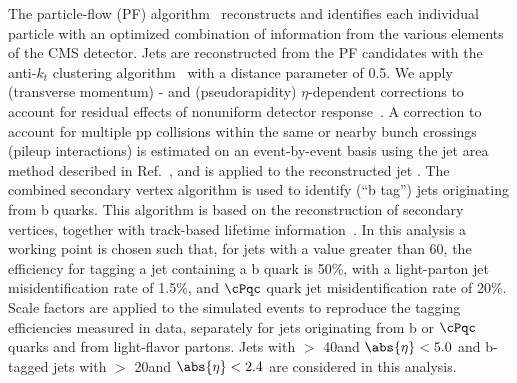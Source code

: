 The particle-flow (PF) algorithm~\cite{CMS-PAS-PFT-09-001,CMS-PAS-PFT-10-001} reconstructs and identifies each individual particle with an optimized combination of information from the various elements of the CMS detector. 
Jets are reconstructed from the PF candidates with the anti-$k_t$ clustering
algorithm~\cite{Cacciari:2008gp} with a distance parameter of 0.5. We apply
 (transverse momentum) \pt- and (pseudorapidity) $\eta$-dependent corrections to account for residual
effects of nonuniform detector response~\cite{Chatrchyan:2011ds}.
A correction to account for multiple pp collisions within the same or nearby
bunch crossings (pileup interactions) is estimated on an event-by-event basis using the
jet area method described in Ref.~\cite{Cacciari:2007fd}, and is
applied to the reconstructed jet \pt.
The combined secondary vertex algorithm is used to identify (``b tag'') jets 
originating from b quarks.  This algorithm 
 is based on the reconstruction of secondary vertices, together with track-based lifetime information~\cite{Chatrchyan:2012jua}. 
In this analysis a working point is chosen such that, for jets with a \PT value greater than 60\GeV, the efficiency for tagging a jet containing a b quark is 50\%, with a light-parton jet misidentification rate of 1.5\%, and $\cPqc$ quark jet misidentification rate of 20\%.
Scale factors are applied to the simulated events to reproduce the tagging efficiencies measured in data, 
separately for jets originating from b or $\cPqc$ quarks and from light-flavor partons.
Jets with  \PT $>$ 40\GeV and $\abs{\eta} < 5.0$ and b-tagged jets with \PT $>$ 20\GeV and $\abs{\eta} < 2.4$ are considered in this analysis.


